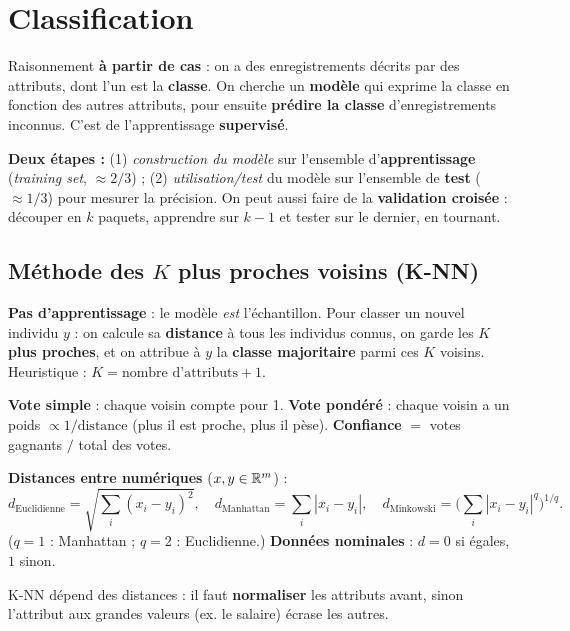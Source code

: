 \chapter{Classification}

\begin{Definition}[Classification]
Raisonnement \textbf{à partir de cas} : on a des enregistrements décrits par des attributs,
dont l'un est la \textbf{classe}. On cherche un \textbf{modèle} qui exprime la classe en
fonction des autres attributs, pour ensuite \textbf{prédire la classe} d'enregistrements
inconnus. C'est de l'apprentissage \textbf{supervisé}.
\end{Definition}

\textbf{Deux étapes :} (1) \emph{construction du modèle} sur l'ensemble d'\textbf{apprentissage}
(\emph{training set}, $\approx 2/3$) ; (2) \emph{utilisation/test} du modèle sur l'ensemble de
\textbf{test} ($\approx 1/3$) pour mesurer la précision. On peut aussi faire de la
\textbf{validation croisée} : découper en $k$ paquets, apprendre sur $k-1$ et tester sur le
dernier, en tournant.

\section{Méthode des $K$ plus proches voisins (K-NN)}

\begin{Definition}[K-NN]
\textbf{Pas d'apprentissage} : le modèle \emph{est} l'échantillon. Pour classer un nouvel
individu $y$ : on calcule sa \textbf{distance} à tous les individus connus, on garde les
\textbf{$K$ plus proches}, et on attribue à $y$ la \textbf{classe majoritaire} parmi ces $K$
voisins. Heuristique : $K = \text{nombre d'attributs} + 1$.
\end{Definition}

\textbf{Vote simple} : chaque voisin compte pour 1. \textbf{Vote pondéré} : chaque voisin a un
poids $\propto 1/\text{distance}$ (plus il est proche, plus il pèse). \textbf{Confiance} $=$
votes gagnants $/$ total des votes.

\textbf{Distances entre numériques} ($x,y\in\mathbb{R}^m$) :
\[ d_{\text{Euclidienne}}=\sqrt{\textstyle\sum_i (x_i-y_i)^2},\quad
   d_{\text{Manhattan}}=\textstyle\sum_i |x_i-y_i|,\quad
   d_{\text{Minkowski}}=\Big(\textstyle\sum_i |x_i-y_i|^q\Big)^{1/q}. \]
($q=1$ : Manhattan ; $q=2$ : Euclidienne.) \textbf{Données nominales} : $d=0$ si égales, $1$
sinon.

\begin{Attention}
K-NN dépend des distances : il faut \textbf{normaliser} les attributs avant, sinon
l'attribut aux grandes valeurs (ex. le salaire) écrase les autres.
\end{Attention}


